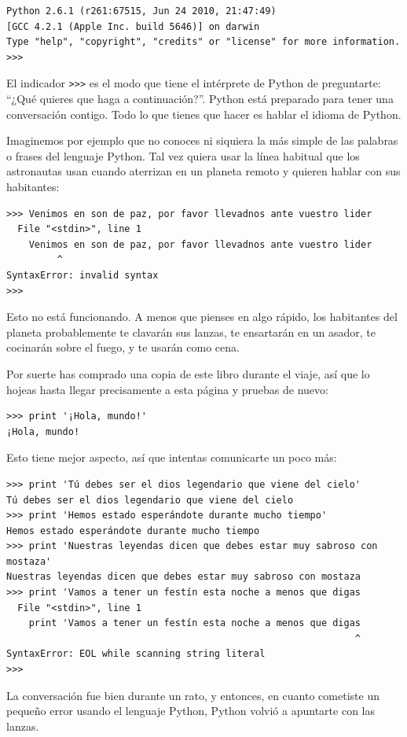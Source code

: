 
\beforeverb
\begin{verbatim}
Python 2.6.1 (r261:67515, Jun 24 2010, 21:47:49) 
[GCC 4.2.1 (Apple Inc. build 5646)] on darwin
Type "help", "copyright", "credits" or "license" for more information.
>>> 
\end{verbatim}
\afterverb
%
El indicador {\tt >>>} es el modo que tiene el intérprete de Python de preguntarte:
``¿Qué quieres que haga a continuación?''. Python está preparado para tener una conversación contigo. Todo lo que tienes que hacer es hablar el idioma de Python.

Imaginemos por ejemplo que no conoces ni siquiera la más simple de las palabras o frases del lenguaje Python. Tal vez quiera usar la línea habitual que los astronautas usan cuando aterrizan en un planeta remoto y quieren hablar con sus habitantes:

\beforeverb
\begin{verbatim}
>>> Venimos en son de paz, por favor llevadnos ante vuestro lider
  File "<stdin>", line 1
    Venimos en son de paz, por favor llevadnos ante vuestro lider
         ^
SyntaxError: invalid syntax
>>> 
\end{verbatim}
\afterverb
%
Esto no está funcionando. A menos que pienses en algo rápido,
los habitantes del planeta probablemente te clavarán sus lanzas,
te ensartarán en un asador, te cocinarán sobre el fuego, y te usarán como cena.

Por suerte has comprado una copia de este libro durante el viaje, así que lo hojeas
hasta llegar precisamente a esta página y pruebas de nuevo:

\beforeverb
\begin{verbatim}
>>> print '¡Hola, mundo!'
¡Hola, mundo!
\end{verbatim}
\afterverb
%
Esto tiene mejor aspecto, así que intentas comunicarte un poco
más:

\beforeverb
\begin{verbatim}
>>> print 'Tú debes ser el dios legendario que viene del cielo'
Tú debes ser el dios legendario que viene del cielo
>>> print 'Hemos estado esperándote durante mucho tiempo'
Hemos estado esperándote durante mucho tiempo
>>> print 'Nuestras leyendas dicen que debes estar muy sabroso con mostaza'
Nuestras leyendas dicen que debes estar muy sabroso con mostaza
>>> print 'Vamos a tener un festín esta noche a menos que digas
  File "<stdin>", line 1
    print 'Vamos a tener un festín esta noche a menos que digas
                                                              ^
SyntaxError: EOL while scanning string literal
>>> 
\end{verbatim}
\afterverb
%
La conversación fue bien durante un rato, y entonces, en cuanto
cometiste un pequeño error usando el lenguaje Python, Python
volvió a apuntarte con las lanzas.

